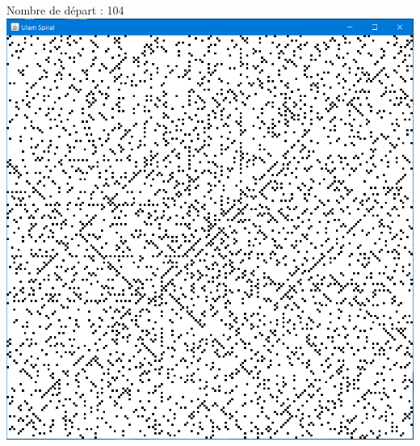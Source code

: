 \documentclass{beamer}
\begin{document}
\begin{frame}
\begin{center}
Nombre de départ : 104\\
\vspace{0.1cm}
\includegraphics[scale=0.3]{images/spirale_104.PNG}
\end{center}
\end{frame}
\end{document}
